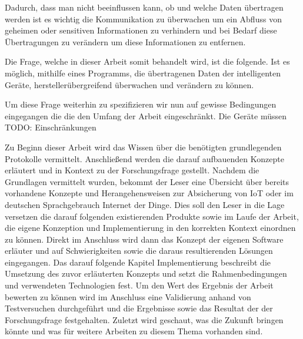     Dadurch, dass man nicht beeinflussen kann, ob und welche Daten übertragen werden ist es wichtig die Kommunikation zu überwachen um ein Abfluss von geheimen oder sensitiven Informationen zu verhindern und bei Bedarf diese Übertragungen zu verändern um diese Informationen zu entfernen.
    
    Die Frage, welche in dieser Arbeit somit behandelt wird, ist die folgende.
    Ist es möglich, mithilfe eines Programms, die übertragenen Daten der intelligenten Geräte, herstellerübergreifend überwachen und verändern zu können.
    
    Um diese Frage weiterhin zu spezifizieren wir nun auf gewisse Bedingungen eingegangen die die den Umfang der Arbeit eingeschränkt.
    Die Geräte müssen 
    TODO: Einschränkungen
    

    Zu Beginn dieser Arbeit wird das Wissen über die benötigten grundlegenden Protokolle vermittelt.
    Anschließend werden die darauf aufbauenden Konzepte erläutert und in Kontext zu der Forschungsfrage gestellt.
    Nachdem die Grundlagen vermittelt wurden, bekommt der Leser eine Übersicht über bereits vorhandene Konzepte und Herangehensweisen zur Absicherung von \ac{IoT} oder im deutschen Sprachgebrauch Internet der Dinge. Dies soll den Leser in die Lage versetzen die darauf folgenden existierenden Produkte sowie im Laufe der Arbeit, die eigene Konzeption und Implementierung in den korrekten Kontext einordnen zu können.
    Direkt im Anschluss wird dann das Konzept der eigenen Software erläuter und auf Schwierigkeiten sowie die daraus resultierenden Lösungen eingegangen. Das darauf folgende Kapitel \glqq Implementierung\grqq{} beschreibt die Umsetzung des zuvor erläuterten Konzepts und setzt die Rahmenbedingungen und verwendeten Technologien fest. Um den Wert des Ergebnis der Arbeit bewerten zu können wird im Anschluss eine Validierung anhand von Testversuchen durchgeführt und die Ergebnisse sowie das Resultat der der Forschungsfrage festgehalten. Zuletzt wird geschaut, was die Zukunft bringen könnte und was für weitere Arbeiten zu diesem Thema vorhanden sind.